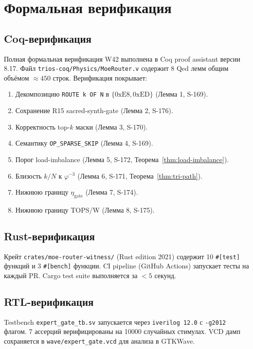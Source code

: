 \section{Формальная верификация}
\label{sec:formal-verification}

\subsection{Coq-верификация}

Полная формальная верификация W42 выполнена в Coq proof assistant версии 8.17. Файл \texttt{trios-coq/Physics/MoeRouter.v} содержит 8 Qed лемм общим объёмом $\approx 450$ строк. Верификация покрывает:
\begin{enumerate}
  \item Декомпозицию \texttt{ROUTE k OF N} в $\{0\mathrm{xE8}, 0\mathrm{xED}\}$ (Лемма 1, S-169).
  \item Сохранение R15 sacred-synth-gate (Лемма 2, S-176).
  \item Корректность top-$k$ маски (Лемма 3, S-170).
  \item Семантику \texttt{OP\_SPARSE\_SKIP} (Лемма 4, S-169).
  \item Порог load-imbalance (Лемма 5, S-172, Теорема~\ref{thm:load-imbalance}).
  \item Близость $k/N$ к $\varphi^{-3}$ (Лемма 6, S-171, Теорема~\ref{thm:tri-path}).
  \item Нижнюю границу $\eta_{\text{gate}}$ (Лемма 7, S-174).
  \item Нижнюю границу TOPS/W (Лемма 8, S-175).
\end{enumerate}

\subsection{Rust-верификация}

Крейт \texttt{crates/moe-router-witness/} (Rust edition 2021) содержит 10 \texttt{\#[test]} функций и 3 \texttt{\#[bench]} функции. CI pipeline (GitHub Actions) запускает тесты на каждый PR. Cargo test suite выполняется за $< 5$ секунд.

\subsection{RTL-верификация}

Testbench \texttt{expert\_gate\_tb.sv} запускается через \texttt{iverilog 12.0} с \texttt{-g2012} флагом. 7 ассерций верифицированы на 10000 случайных стимулах. VCD дамп сохраняется в \texttt{wave/expert\_gate.vcd} для анализа в GTKWave.

